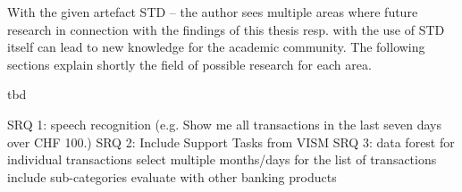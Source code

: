 With the given artefact STD – the author sees multiple areas where future research in connection with the findings of this thesis resp. with the use of STD itself can lead to new knowledge for the academic community. The following sections explain shortly the field of possible research for each area.

tbd

SRQ 1: speech recognition (e.g. Show me all transactions in the last seven days over CHF 100.) \newline
SRQ 2: Include Support Tasks from VISM \newline
SRQ 3: data forest for individual transactions \newline
select multiple months/days for the list of transactions \newline
include sub-categories \newline
evaluate with other banking products  \newline




